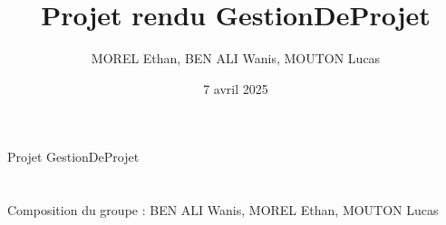 \documentclass{article}
\title{Projet rendu GestionDeProjet}
\author{MOREL Ethan, BEN ALI Wanis, MOUTON Lucas}
\date{7 avril 2025}
\begin{document}
\maketitle
Projet GestionDeProjet
\section {}
Composition du groupe : BEN ALI Wanis, MOREL Ethan, MOUTON Lucas \\
\end{document}
